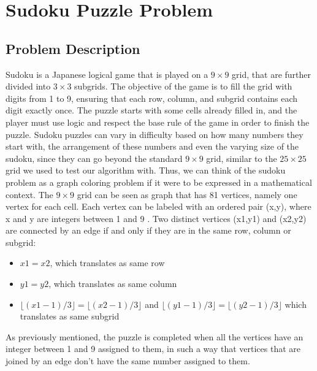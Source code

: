 \section{Sudoku Puzzle Problem}
\label{sec:problem_description}
\subsection{Problem Description}
{Sudoku is a Japanese logical game that is played on a $9 \times 9$ grid, that are further divided into $3 \times 3$ subgrids. The objective of the game is to fill the grid with digits from 1 to 9, ensuring that each row, column, and subgrid contains each digit exactly once\cite{Mantere2007}. The puzzle starts with some cells already filled in, and the player must use logic and respect the base rule of the game in order to finish the puzzle.}
{\newline}
{\newline Sudoku puzzles can vary in difficulty based on how many numbers they start with, the arrangement of these numbers and even the varying size of the sudoku, since they can go beyond the standard $9 \times 9$ grid, similar to the $25 \times 25$ grid we used to test our algorithm with. Thus, we can think of the sudoku problem as a graph coloring problem if it were to be expressed in a mathematical context. The $9 \times 9$ grid can be seen as graph that has 81 vertices, namely one vertex for each cell. Each vertex can be labeled with an ordered pair (x,y), where x and y are integers between 1 and 9 \cite{WikiMathematics}. Two distinct vertices (x1,y1) and (x2,y2) are connected by an edge if and only if they are in the same row, column or subgrid:}
\begin {itemize}
    \item $x1 = x2$, which translates as same row
    \item $y1 = y2$, which translates as same column
    \item $\lfloor (x1-1)/3 \rfloor = \lfloor (x2-1)/3 \rfloor$ and $\lfloor (y1-1)/3 \rfloor = \lfloor (y2-1)/3 \rfloor$ which translates as same subgrid
\end {itemize}
{As previously mentioned, the puzzle is completed when all the vertices have an integer between 1 and 9 assigned to them, in such a way that vertices that are joined by an edge don't have the same number assigned to them. }
